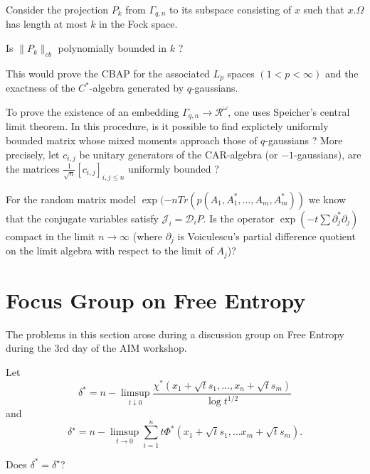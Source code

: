 \documentclass[12pt,letterpaper, reqno]{amsart}
\begin{document}
\begin{problemblock}

Consider the projection $P_k$ from $\Gamma_{q,n}$ to its subspace
consisting of $x$ such that $x.\Omega$ has length at most $k$ in the Fock 
space.
\begin{problem}
 Is $\|P_k\|_{cb}$ polynomially bounded in $k$ ?
\end{problem}
This would prove the 
CBAP for the associated $L_p$ spaces $(1<p<\infty)$ and the exactness of the 
$C^*$-algebra generated by $q$-gaussians.
 \end{problemblock}\begin{problem}
To prove the existence of an embedding $\Gamma_{q,n}\to \mathcal R^\omega$, 
one 
uses Speicher's central limit theorem. In this procedure, 
is it possible to find explictely uniformly bounded matrix whose mixed moments
approach those of $q$-gaussians ? More precisely, let $c_{i,j}$ be unitary
generators of the CAR-algebra (or $-1$-gaussians), are the matrices $\frac 1
{\sqrt n}[c_{i,j}]_{i,j\le n}$ uniformly bounded ? \end{problem}
\begin{problemblock}
\begin{problem}
 For the random matrix model $\exp(-nTr(p(A_{1},A_{1}^{*},\ldots,A_{m},A_{m}^{*}))$
we know that the conjugate variables satisfy $\mathcal{J}_{i}=\mathcal{D}_{i}P$.
Is the operator $\exp(-t\sum\partial_{j}^{*}\partial_{j})$ compact
in the limit $n\rightarrow\infty$ (where $\partial_{j}$ is Voiculescu's
partial difference quotient on the limit algebra with respect to the
limit of $A_{j}$)?
\end{problem}\begin{comment}As a starting point, consider $P=\sum A_{i}^{2}+\sum t_{i}q_{i}(A_{1},\ldots,A_{m})$
where Guionnet and Maurel-Segala have shown convergence of the model.
\end{comment}
 \end{problemblock}

\section{Focus Group on Free Entropy}
The problems in this section arose during a discussion group
on Free Entropy during the 3rd day of the AIM workshop.

\begin{problemblock}
Let
 \[
\delta^{*}=n-\limsup_{t\downarrow0}\frac{\chi^{*}(x_{1}+\sqrt{t}s_{1},\ldots,x_{n}+\sqrt{t}s_{m})}{\log t^{1/2}}\]
 and\[
\delta^{\star}=n-\limsup_{t\rightarrow0}\sum_{i=1}^{n}t\Phi^{*}(x_{1}+\sqrt{t}s_{1},\ldots x_{m}+\sqrt{t}s_{m})\textrm{.}\]

\begin{problem}{Does $\delta^{*}=\delta^{\star}$?}
\end{problem}

\end{problemblock}
\end{document}
